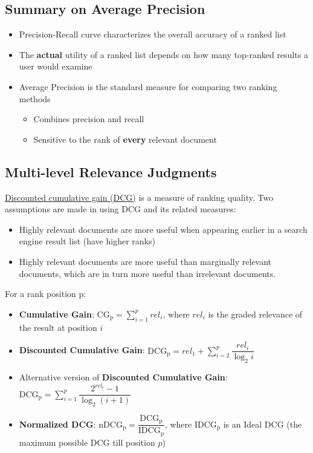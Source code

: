 \subsection{Summary on Average Precision}
\begin{itemize}
\item Precision-Recall curve characterizes the overall accuracy of a ranked list
\item The \textbf{actual} utility of a ranked list depends on how many top-ranked results a user would examine
\item Average Precision is the standard measure for comparing two ranking methods
\begin{itemize}
\item Combines precision and recall
\item Sensitive to the rank of \textbf{every} relevant document
\end{itemize}
\end{itemize}

\subsection{Multi-level Relevance Judgments}
\href{http://en.wikipedia.org/wiki/Discounted_cumulative_gain}{Discounted cumulative gain (DCG)} is a measure of ranking quality. Two assumptions are made in using DCG and its related measures:
\begin{itemize}
\item Highly relevant documents are more useful when appearing earlier in a search engine result list (have higher ranks)
\item Highly relevant documents are more useful than marginally relevant documents, which are in turn more useful than irrelevant documents.
\end{itemize}

For a rank position p:
\begin{itemize}
\item \textbf{Cumulative Gain}: $\mathrm{CG_p} = \sum\limits_{i=1}^{p}rel_i$, where $rel_i$ is the graded relevance of the result at position $i$
\item \textbf{Discounted Cumulative Gain}: $\mathrm{DCG_p} = rel_1 + \sum\limits_{i=2}^{p}\dfrac{rel_i}{\log_{2}i}$
\item Alternative version of \textbf{Discounted Cumulative Gain}: $\mathrm{DCG_p} = \sum\limits_{i=1}^{p}\dfrac{2^{rel_i}-1}{\log_{2}(i+1)}$
\item \textbf{Normalized DCG}: $\mathrm{nDCG_p} = \dfrac{\mathrm{DCG_p}}{\mathrm{IDCG_p}}$, where $\mathrm{IDCG_p}$ is an Ideal DCG (the maximum possible DCG till position $p$)
\end{itemize}

